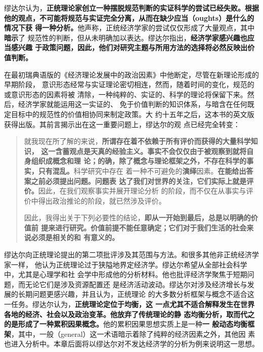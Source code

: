 缪达尔认为，\textbf{正统理论家创立一种摆脱规范判断的实证科学的尝试已经失败。根据
  他的观点，不可能将规范与实证完全分离，从而在缺少应当（oughts）是什么的情况下获
  得一种分析。}他声称，正统经济学家的尝试仅仅形成了大量观点，其中\textbf{暗示}了
规范性的判断，但从未明确加以表达。缪达尔指出，\textbf{经济学家感兴趣也应当感兴趣
  于政策问题，因此，他们对研究主题与所用方法的选择将必然反映出价值判断。}

在最初瑞典语版的《经济理论发展中的政治因素》中他断定，尽管在新理论形成的早期阶段，
意识形态经常与实证理论密切相连，然而，随着时间的变化，规范的或意识形态的因素将被
清除，一种纯粹的、实证的、科学的理论将保留下来。然后，经济学家就能运用这一实证的、
免于价值判断的知识体系，与暗含在任何既定目标中的规范性的价值相协同来制定政策。大
约十五年之后，这本书的英文版获得出版。其前言揭示出在这一重要问题上，缪达尔的观
点已经完全转变：
\begin{quotation}
  就我现在所了解的来说，\textbf{所谓存在着不依赖于所有评价而获得的大量科学知识，
    这一含蓄观点是天真的经验主义。事实不会仅仅由于被观察到就将自身组织成概念和理
    论；的确，除了概念与理论框架之外，不存在科学的事实，只有混乱。}科学研究中存在
  着一种不可避免的\textbf{演绎}因素。\textbf{在能给出答案之前必须提出问题。问题表
    达了我们对世界的关注，它们实际上就是评价。}因此，在我们观察事实并展开理论分析
  的阶段，而不仅在从事实与评价中得出政治推论的阶段，就已然涉及评价。

  因此，我得出关于下列必要性的结论，\textbf{即从一开始到最后，总是以明确的价值前
    提来进行研究。价值前提不能任意确定；它们对于我们生活的社会来说必须是相关的和
    有意义的。}
\end{quotation}

缪达尔向正统理论提出的第二项批评涉及其范围与方法。和很多其他非正统经济学家一样，
他认为正统理论过于狭隘地界定经济学。缪达尔希望从全部社会科学中，尤其是心理学和社
会学中形成他的分析材料。他也批评经济学聚焦于短期问题，而无论它们是涉及资源配置还
是经济活动波动。缪达尔对涉及经济增长与发展的长期问题更感兴趣，并且认为，正统理论
的大多数分析框架与概念不适合这一任务。缪达尔认为，\textbf{正统理论定位于均衡，这
  一点尤其不适合解释发生在世界各地的经济、社会以及政治变革。他放弃了传统理论的静
  态均衡分析，取而代之的是形成了一种累积因果概念。}他的累积因果思想实质上是一种\textbf{一
般动态均衡框架}，其中，一般（general）这一术语暗示着除了纯粹的经济因素之外，其他因
素也进入分析中。本章后面将以缪达尔对不发达经济学的分析为例来说明这一思想。


